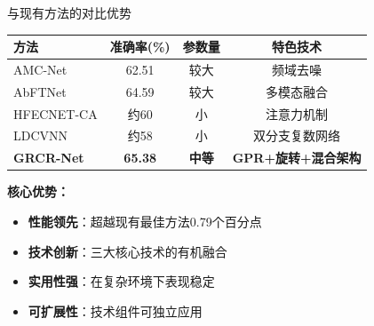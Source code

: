 \documentclass[aspectratio=169]{beamer}
\begin{document}
\begin{frame}{与现有方法的对比优势}
\begin{table}[h]
\centering
\scriptsize
\begin{tabular}{@{}lccc@{}}
\toprule
\textbf{方法} & \textbf{准确率(\%)} & \textbf{参数量} & \textbf{特色技术} \\
\midrule
AMC-Net & 62.51 & 较大 & 频域去噪 \\
AbFTNet & 64.59 & 较大 & 多模态融合 \\
HFECNET-CA & 约60 & 小 & 注意力机制 \\
LDCVNN & 约58 & 小 & 双分支复数网络 \\
\midrule
\textcolor{zjutred}{\textbf{GRCR-Net}} & \textcolor{zjutred}{\textbf{65.38}} & \textcolor{zjutred}{\textbf{中等}} & \textcolor{zjutred}{\textbf{GPR+旋转+混合架构}} \\
\bottomrule
\end{tabular}
\end{table}

\vspace{0.5cm}
\textbf{核心优势：}
\begin{itemize}
\item \textcolor{zjutgreen}{\textbf{性能领先}}：超越现有最佳方法0.79个百分点
\item \textcolor{zjutgreen}{\textbf{技术创新}}：三大核心技术的有机融合
\item \textcolor{zjutgreen}{\textbf{实用性强}}：在复杂环境下表现稳定
\item \textcolor{zjutgreen}{\textbf{可扩展性}}：技术组件可独立应用
\end{itemize}
\end{frame}
\end{document}
